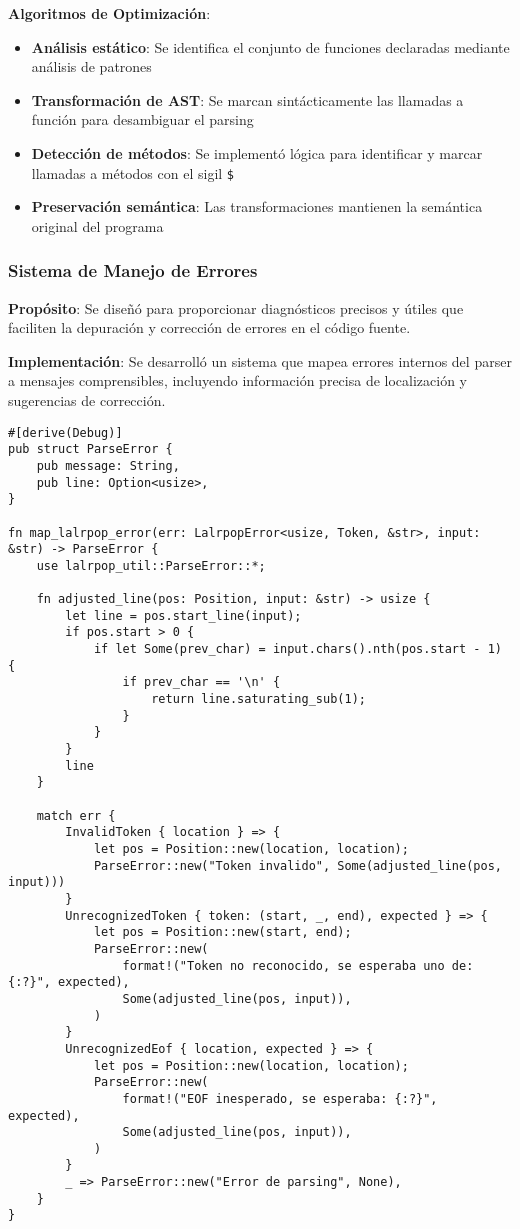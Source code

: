 \documentclass[12pt,a4paper]{article}
\begin{document}
\textbf{Algoritmos de Optimización}:
\begin{itemize}
    \item \textbf{Análisis estático}: Se identifica el conjunto de funciones declaradas mediante análisis de patrones
    \item \textbf{Transformación de AST}: Se marcan sintácticamente las llamadas a función para desambiguar el parsing
    \item \textbf{Detección de métodos}: Se implementó lógica para identificar y marcar llamadas a métodos con el sigil \texttt{\$}
    \item \textbf{Preservación semántica}: Las transformaciones mantienen la semántica original del programa
\end{itemize}

\subsubsection{Sistema de Manejo de Errores}

\textbf{Propósito}: Se diseñó para proporcionar diagnósticos precisos y útiles que faciliten la depuración y corrección de errores en el código fuente.

\textbf{Implementación}: Se desarrolló un sistema que mapea errores internos del parser a mensajes comprensibles, incluyendo información precisa de localización y sugerencias de corrección.

\begin{lstlisting}[style=rustcode,caption=Sistema de manejo de errores]
#[derive(Debug)]
pub struct ParseError {
    pub message: String,
    pub line: Option<usize>,
}

fn map_lalrpop_error(err: LalrpopError<usize, Token, &str>, input: &str) -> ParseError {
    use lalrpop_util::ParseError::*;

    fn adjusted_line(pos: Position, input: &str) -> usize {
        let line = pos.start_line(input);
        if pos.start > 0 {
            if let Some(prev_char) = input.chars().nth(pos.start - 1) {
                if prev_char == '\n' {
                    return line.saturating_sub(1);
                }
            }
        }
        line
    }

    match err {
        InvalidToken { location } => {
            let pos = Position::new(location, location);
            ParseError::new("Token invalido", Some(adjusted_line(pos, input)))
        }
        UnrecognizedToken { token: (start, _, end), expected } => {
            let pos = Position::new(start, end);
            ParseError::new(
                format!("Token no reconocido, se esperaba uno de: {:?}", expected),
                Some(adjusted_line(pos, input)),
            )
        }
        UnrecognizedEof { location, expected } => {
            let pos = Position::new(location, location);
            ParseError::new(
                format!("EOF inesperado, se esperaba: {:?}", expected),
                Some(adjusted_line(pos, input)),
            )
        }
        _ => ParseError::new("Error de parsing", None),
    }
}
\end{lstlisting}
\end{document}
